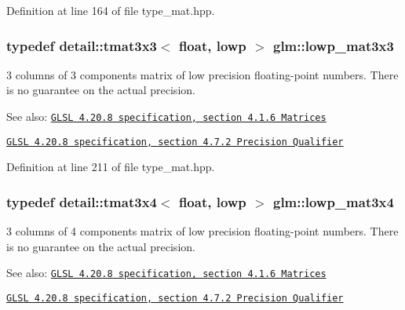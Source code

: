 Definition at line 164 of file type\_\-mat.hpp.\hypertarget{group__core__precision_g31688b397d10806ead332c3adb7dc0f0}{
\subsubsection[lowp\_\-mat3x3]{\setlength{\rightskip}{0pt plus 5cm}typedef detail::tmat3x3$<$ float, lowp $>$ {\bf glm::lowp\_\-mat3x3}}}
\label{group__core__precision_g31688b397d10806ead332c3adb7dc0f0}


3 columns of 3 components matrix of low precision floating-point numbers. There is no guarantee on the actual precision.

\begin{Desc}
\item[See also:]\href{http://www.opengl.org/registry/doc/GLSLangSpec.4.20.8.pdf}{\tt GLSL 4.20.8 specification, section 4.1.6 Matrices} 

\href{http://www.opengl.org/registry/doc/GLSLangSpec.4.20.8.pdf}{\tt GLSL 4.20.8 specification, section 4.7.2 Precision Qualifier} \end{Desc}


Definition at line 211 of file type\_\-mat.hpp.\hypertarget{group__core__precision_g9cea06e7378fe59abf95c1f56edc4320}{
\subsubsection[lowp\_\-mat3x4]{\setlength{\rightskip}{0pt plus 5cm}typedef detail::tmat3x4$<$ float, lowp $>$ {\bf glm::lowp\_\-mat3x4}}}
\label{group__core__precision_g9cea06e7378fe59abf95c1f56edc4320}


3 columns of 4 components matrix of low precision floating-point numbers. There is no guarantee on the actual precision.

\begin{Desc}
\item[See also:]\href{http://www.opengl.org/registry/doc/GLSLangSpec.4.20.8.pdf}{\tt GLSL 4.20.8 specification, section 4.1.6 Matrices} 

\href{http://www.opengl.org/registry/doc/GLSLangSpec.4.20.8.pdf}{\tt GLSL 4.20.8 specification, section 4.7.2 Precision Qualifier} \end{Desc}


